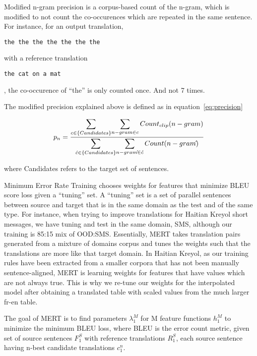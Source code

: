 Modified n-gram precision is a corpus-based count of the n-gram, which is modified to not count the co-occurences which are repeated in the same sentence. For instance, for an output translation, \begin{verbatim}the the the the the the the\end{verbatim} with a reference translation \begin{verbatim}the cat on a mat\end{verbatim}, the co-occurence of ``the'' is only counted once. And not 7 times. 

The modified precision explained above is defined as in equation~\eqref{eq:precision}

\begin{equation} \label{eq:precision}
	p_{n} = \frac{\mathlarger{\sum\limits_{c \in \{Candidates\}}} \mathlarger{\sum\limits_{n-gram \in c}Count_{clip}(n-gram)}}
			{\mathlarger{\sum\limits_{\acute{c} \in \{Candidates\}}} \mathlarger{\sum\limits_{n-gram\acute{} \in \acute{c}}Count(n-gram\acute{})}}
\end{equation}

where Candidates refers to the target set of sentences. 

Minimum Error Rate Training chooses weights for features that minimize BLEU score loss given a ``tuning'' set. A ``tuning'' set is a set of parallel sentences between source and target that is in the same domain as the test and of the same type. For instance, when trying to improve translations for Haitian Kreyol short messages, we have tuning and test in the same domain, SMS, although our training is 85:15 mix of OOD:SMS. Essentially, MERT takes translation pairs generated from a mixture of domains corpus and tunes the weights such that the translations are more like that target domain. In Haitian Kreyol, as our training rules have been extracted from a smaller corpora that has not been manually sentence-aligned, MERT is learning weights for features that have values which are not always true. This is why we re-tune our weights for the interpolated model after obtaining a translated table with scaled values from the much larger fr-en table. 

The goal of MERT is to find parameters $\lambda_{1}^{M}$ for M feature functions $h_{1}^{M}$ to minimize the minimum BLEU loss, where BLEU is the error count metric, given set of source sentences $F_{1}^{S}$ with reference translations $R_{1}^{S}$, each source sentence having n-best candidate translations $c_{1}^{n}$. 


